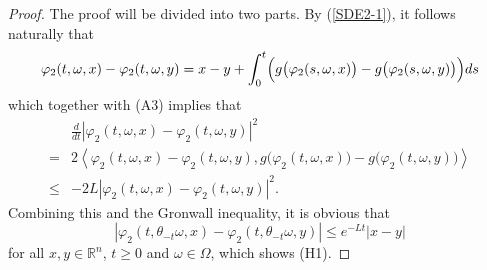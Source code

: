 \documentclass[10pt,a4paper]{amsart}
\begin{document}
\begin{proof}
The proof will be divided into two parts. By (\ref{SDE2-1}), it follows naturally that
\begin{equation}\label{eq37}
\varphi_2(t,\omega,x)-\varphi_2(t,\omega,y)=x-y+\int_0^t\Bigl(g\bigl(\varphi_2(s,\omega,x)\bigr)-g\bigl(\varphi_2(s,\omega,y)\bigr)\Bigr)ds
\end{equation}
which together with (A3) implies that
\begin{align}\label{eq38}
&\frac{d}{dt}|\varphi_2(t,\omega,x)-\varphi_2(t,\omega,y)|^2\nonumber\\
=&2\left\langle\varphi_2(t,\omega,x)-\varphi_2(t,\omega,y),g\bigl(\varphi_2(t,\omega,x)\bigr)-g\bigl(\varphi_2(t,\omega,y)\bigr)\right\rangle\nonumber\\
\leq&-2L|\varphi_2(t,\omega,x)-\varphi_2(t,\omega,y)|^2.
\end{align}
Combining this and the Gronwall inequality, it is obvious that
\begin{equation}\label{eq39}
|\varphi_2(t,\theta_{-t}\omega,x)-\varphi_2(t,\theta_{-t}\omega,y)|\leq e^{-L t}|x-y|
\end{equation}
for all $x,y\in\mathbb{R}^n$, $t\geq0$ and $\omega\in\Omega$, which shows (H1).


\end{proof}
\end{document}
